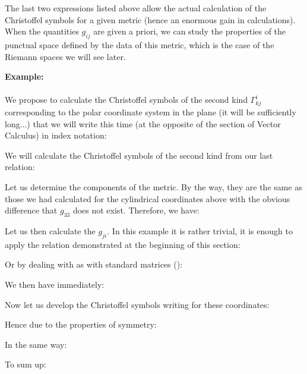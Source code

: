 	The last two expressions listed above allow the actual calculation of the Christoffel symbols for a given metric (hence an enormous gain in calculations). When the quantities $g_{ij}$ are given a priori, we can study the properties of the punctual space defined by the data of this metric, which is the case of the Riemann spaces we will see later.
	
	\pagebreak
	\begin{tcolorbox}[colframe=black,colback=white,sharp corners]
	\textbf{{\Large {}}Example:}\\\\
	We propose to calculate the Christoffel symbols of the second kind $\Gamma_{kj}^i$ corresponding to the polar coordinate system in the plane  (it will be sufficiently long...) that we will write this time (at the opposite of the section of Vector Calculus) in index notation:
	
	We will calculate the Christoffel symbols of the second kind from our last relation:
	
	Let us determine the components of the metric. By the way, they are the same as those we had calculated for the cylindrical coordinates above with the obvious difference that $g_{33}$ does not exist. Therefore, we have:
	
	Let us then calculate the $g_{ji}$. In this example it is rather trivial, it is enough to apply the relation demonstrated at the beginning of this section:
	
	Or by dealing with as with standard matrices ():
	
	We then have immediately:
	
	Now let us develop the Christoffel symbols writing for these coordinates:
	\end{tcolorbox}
	
	
	\begin{tcolorbox}[colframe=black,colback=white,sharp corners]
	
	Hence due to the properties of symmetry:
	
	In the same way:
	
	\end{tcolorbox}
	
	
	\begin{tcolorbox}[colframe=black,colback=white,sharp corners]
	To sum up:
	
	\end{tcolorbox}
	
